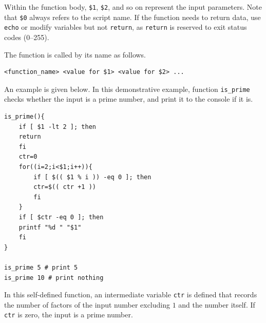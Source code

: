 Within the function body, \verb|$1|, \verb|$2|, and so on represent the input parameters. Note that \verb|$0| always refers to the script name. If the function needs to return data, use \verb|echo| or modify variables but not \verb|return|, as \verb|return| is reserved to exit status codes (0–255).

The function is called by its name as follows.
\begin{lstlisting}
<function_name> <value for $1> <value for $2> ...
\end{lstlisting}

An example is given below. In this demonstrative example, function \verb|is_prime| checks whether the input is a prime number, and print it to the console if it is.
\begin{lstlisting}
is_prime(){ 
	if [ $1 -lt 2 ]; then 
	return 
	fi 
	ctr=0 
	for((i=2;i<$1;i++)){ 
		if [ $(( $1 % i )) -eq 0 ]; then 
		ctr=$(( ctr +1 )) 
		fi 
	}
	if [ $ctr -eq 0 ]; then 
	printf "%d " "$1" 
	fi 
}

is_prime 5 # print 5
is_prime 10 # print nothing
\end{lstlisting}
In this self-defined function, an intermediate variable \verb|ctr| is defined that records the number of factors of the input number excluding $1$ and the number itself. If \verb|ctr| is zero, the input is a prime number.
